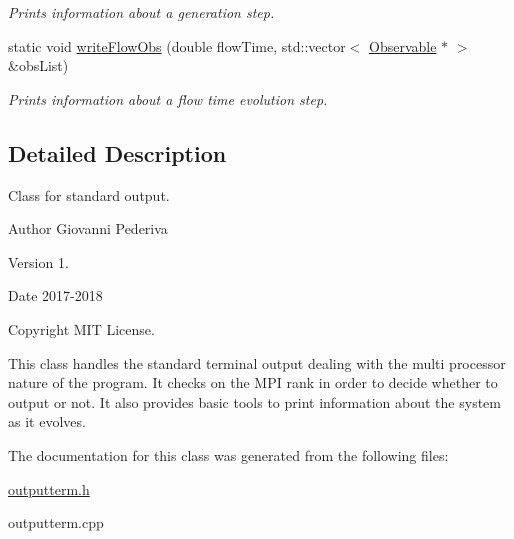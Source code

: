 \begin{DoxyCompactItemize}
\begin{DoxyCompactList}\small\item\em Prints information about a generation step. \end{DoxyCompactList}\item 
static void \hyperlink{classLatticeIO_1_1OutputTerm_a4ba09f68c5cc215b03ca3aec47d76d65}{write\+Flow\+Obs} (double flow\+Time, std\+::vector$<$ \hyperlink{classObservable}{Observable} $\ast$ $>$ \&obs\+List)\hypertarget{classLatticeIO_1_1OutputTerm_a4ba09f68c5cc215b03ca3aec47d76d65}{}\label{classLatticeIO_1_1OutputTerm_a4ba09f68c5cc215b03ca3aec47d76d65}

\begin{DoxyCompactList}\small\item\em Prints information about a flow time evolution step. \end{DoxyCompactList}\end{DoxyCompactItemize}


\subsection{Detailed Description}
Class for standard output. 

\begin{DoxyAuthor}{Author}
Giovanni Pederiva 
\end{DoxyAuthor}
\begin{DoxyVersion}{Version}
1. 
\end{DoxyVersion}
\begin{DoxyDate}{Date}
2017-\/2018 
\end{DoxyDate}
\begin{DoxyCopyright}{Copyright}
M\+IT License.
\end{DoxyCopyright}
This class handles the standard terminal output dealing with the multi processor nature of the program. It checks on the M\+PI rank in order to decide whether to output or not. It also provides basic tools to print information about the system as it evolves. 

The documentation for this class was generated from the following files\+:\begin{DoxyCompactItemize}
\item 
\hyperlink{outputterm_8h}{outputterm.\+h}\item 
outputterm.\+cpp\end{DoxyCompactItemize}
